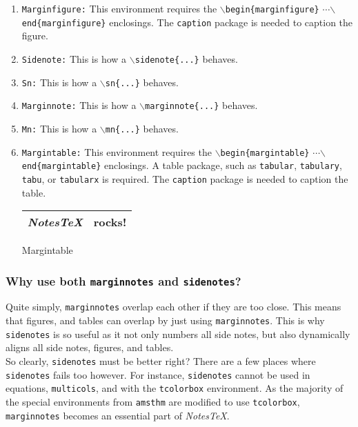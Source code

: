\documentclass[10pt]{article}
\begin{document}
	\begin{enumerate}
		\item \texttt{Marginfigure:} This environment requires the \texttt{$\backslash$begin\{marginfigure\}} {$\cdots$}\newline\texttt{$\backslash$end\{marginfigure\}} enclosings. The \texttt{caption} package is needed to caption the figure.
		\item \texttt{Sidenote:} This is how a \texttt{$\backslash$sidenote\{...\}} behaves.
		\item \texttt{Sn:} This is how a \texttt{$\backslash$sn\{...\}} behaves.
		\item \texttt{Marginnote:} This is how a \texttt{$\backslash$marginnote\{...\}} behaves.
		\item \texttt{Mn:} This is how a \texttt{$\backslash$mn\{...\}} behaves.
		\item \texttt{Margintable:} This environment requires the \texttt{$\backslash$begin\{margintable\}} {$\cdots$}\newline\texttt{$\backslash$end\{margintable\}} enclosings. A table package, such as \texttt{tabular}, \texttt{tabulary}, \texttt{tabu}, or \texttt{tabularx} is required. The \texttt{caption} package is needed to caption the table.
		\begin{margintable}
			\begin{tabularx}{\marginparwidth}{|X|X|}
			\hline
			\textit{NotesTeX} & \textbf{rocks!}\\
			\hline
			\end{tabularx}
			\caption{Margintable}
		\end{margintable}
	\end{enumerate}
	\subsubsection{Why use both \texttt{marginnotes} and \texttt{sidenotes}?}
	Quite simply, \texttt{marginnotes} overlap each other if they are too close. This means that figures, and tables can overlap by just using \texttt{marginnotes}. This is why \texttt{sidenotes} is so useful as it not only numbers all side notes, but also dynamically aligns all side notes, figures, and tables.\\


	\noindent So clearly, \texttt{sidenotes} must be better right? There are a few places where \texttt{sidenotes} fails too however. For instance, \texttt{sidenotes} cannot be used in equations, \texttt{multicols}, and with the \texttt{tcolorbox} environment. As the majority of the special environments from \texttt{amsthm} are modified to use \texttt{tcolorbox}, \texttt{marginnotes} becomes an essential part of \textit{NotesTeX}.
\end{document}
